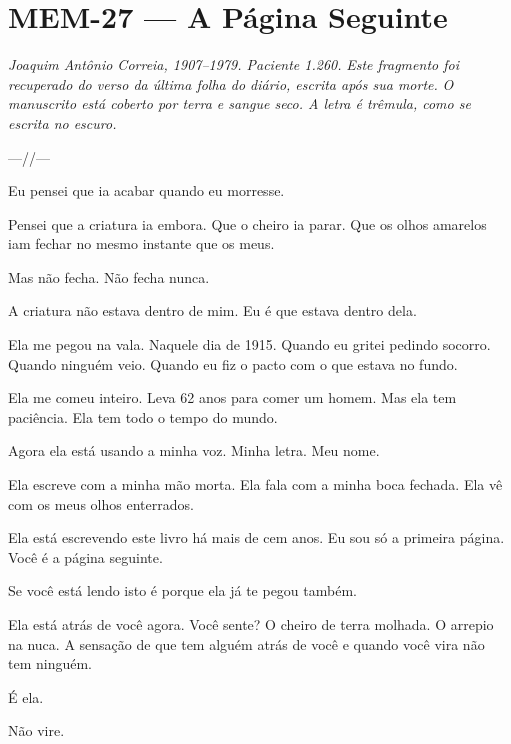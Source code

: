 \section*{\textbf{MEM-27} --- A Página Seguinte}

\noindent \textit{Joaquim Antônio Correia, 1907--1979. Paciente 1.260.}
\textit{Este fragmento foi recuperado do verso da última folha do diário, escrita após sua morte.}
\textit{O manuscrito está coberto por terra e sangue seco. A letra é trêmula, como se escrita no escuro.}

\noindent ---//---

\noindent Eu pensei que ia acabar quando eu morresse.

\noindent Pensei que a criatura ia embora. Que o cheiro ia parar. Que os olhos amarelos iam fechar no mesmo instante que os meus.

\noindent Mas não fecha. Não fecha nunca.

\noindent A criatura não estava dentro de mim. Eu é que estava dentro dela.

\noindent Ela me pegou na vala. Naquele dia de 1915. Quando eu gritei pedindo socorro. Quando ninguém veio. Quando eu fiz o pacto com o que estava no fundo.

\noindent Ela me comeu inteiro. Leva 62 anos para comer um homem. Mas ela tem paciência. Ela tem todo o tempo do mundo.

\noindent Agora ela está usando a minha voz. Minha letra. Meu nome.

\noindent Ela escreve com a minha mão morta. Ela fala com a minha boca fechada. Ela vê com os meus olhos enterrados.

\noindent Ela está escrevendo este livro há mais de cem anos. Eu sou só a primeira página. Você é a página seguinte.

\noindent Se você está lendo isto é porque ela já te pegou também.

\noindent Ela está atrás de você agora. Você sente? O cheiro de terra molhada. O arrepio na nuca. A sensação de que tem alguém atrás de você e quando você vira não tem ninguém.

\noindent É ela.

\noindent Não vire.

